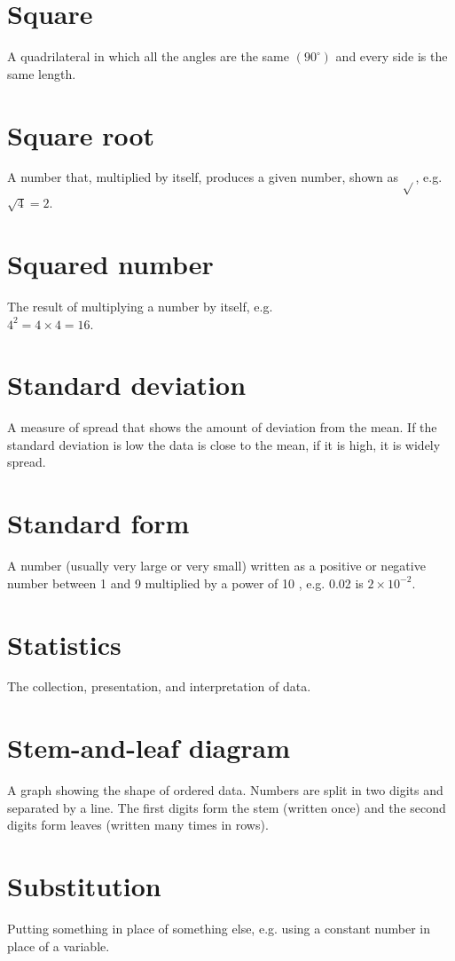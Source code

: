 \documentclass[10pt]{article}
\begin{document}
\section*{Square}
A quadrilateral in which all the angles are the same $\left(90^{\circ}\right)$ and every side is the same length.

\section*{Square root}
A number that, multiplied by itself, produces a given number, shown as $\sqrt{ }$, e.g. $\sqrt{4}=2$.

\section*{Squared number}
The result of multiplying a number by itself, e.g.\\
$4^{2}=4 \times 4=16$.

\section*{Standard deviation}
A measure of spread that shows the amount of deviation from the mean. If the standard deviation is low the data is close to the mean, if it is high, it is widely spread.

\section*{Standard form}
A number (usually very large or very small) written as a positive or negative number between 1 and 9 multiplied by a power of 10 , e.g. 0.02 is $2 \times 10^{-2}$.

\section*{Statistics}
The collection, presentation, and interpretation of data.

\section*{Stem-and-leaf diagram}
A graph showing the shape of ordered data. Numbers are split in two digits and separated by a line. The first digits form the stem (written once) and the second digits form leaves (written many times in rows).

\section*{Substitution}
Putting something in place of something else, e.g. using a constant number in place of a variable.
\end{document}
